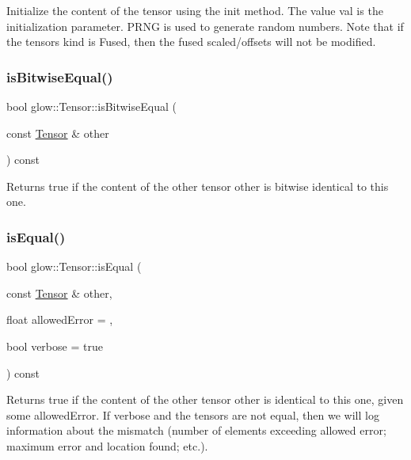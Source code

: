 Initialize the content of the tensor using the {\ttfamily init} method. The value {\ttfamily val} is the initialization parameter. {\ttfamily P\+R\+NG} is used to generate random numbers. Note that if the tensor\textquotesingle{}s kind is Fused, then the fused scaled/offsets will not be modified. \mbox{\label{classglow_1_1_tensor_a9e4db56127af74adb5d9d6315bd6813c}} 
\subsubsection{\texorpdfstring{is\+Bitwise\+Equal()}{isBitwiseEqual()}}
{\footnotesize\ttfamily bool glow\+::\+Tensor\+::is\+Bitwise\+Equal (\begin{DoxyParamCaption}\item[{const \hyperlink{classglow_1_1_tensor}{Tensor} \&}]{other }\end{DoxyParamCaption}) const\hspace{0.3cm}{\ttfamily [inline]}}

\begin{DoxyReturn}{Returns}
true if the content of the other tensor {\ttfamily other} is bitwise identical to this one. 
\end{DoxyReturn}
\mbox{\label{classglow_1_1_tensor_adc8169ad48bdffbd2e8fa18b914cc73a}} 
\subsubsection{\texorpdfstring{is\+Equal()}{isEqual()}}
{\footnotesize\ttfamily bool glow\+::\+Tensor\+::is\+Equal (\begin{DoxyParamCaption}\item[{const \hyperlink{classglow_1_1_tensor}{Tensor} \&}]{other,  }\item[{float}]{allowed\+Error = {},  }\item[{bool}]{verbose = {\ttfamily true} }\end{DoxyParamCaption}) const\hspace{0.3cm}{\ttfamily [inline]}}

\begin{DoxyReturn}{Returns}
true if the content of the other tensor {\ttfamily other} is identical to this one, given some {\ttfamily allowed\+Error}. If {\ttfamily verbose} and the tensors are not equal, then we will log information about the mismatch (number of elements exceeding allowed error; maximum error and location found; etc.). 
\end{DoxyReturn}
\mbox{\label{classglow_1_1_tensor_ac6a74e37ff3771b581afc94291899f20}} 
